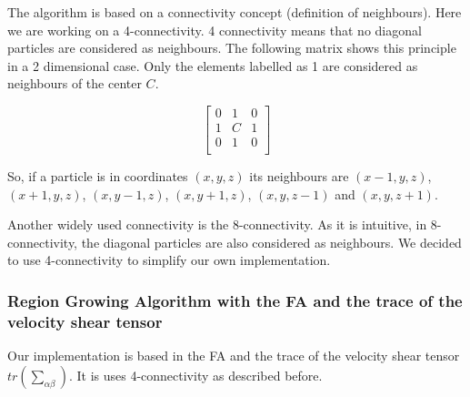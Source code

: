 \documentclass[12pt]{article}
\begin{document}
\begin{par}
The algorithm is based on a connectivity concept (definition of
neighbours). Here we are working on a 4-connectivity. 4
connectivity means that no diagonal particles are considered as
neighbours. The following matrix shows this principle in a 2
dimensional case. Only the elements labelled as 1 are considered as
neighbours of the center $C$.
\end{par}

\[ 
\begin{bmatrix} 
    0 & 1 & 0 \\
    1 & C & 1 \\
    0 & 1 & 0\\
\end{bmatrix} 
\]

\begin{par}
So, if a particle is in coordinates $(x,y,z)$ its neighbours are
$(x-1,y,z)$, $(x+1,y,z)$, $(x,y-1,z)$, $(x,y+1,z)$, $(x,y,z-1)$
and $(x,y,z+1)$.
\end{par}

\begin{par}
Another widely used connectivity is the 8-connectivity. As it is
intuitive, in 8-connectivity, the diagonal particles are also
considered as neighbours. We decided to use 4-connectivity to
simplify our own implementation.
\end{par}




\subsubsection{Region Growing Algorithm with the FA and the trace of the velocity shear tensor}\label{sec:own_impl_descr}
Our implementation is based in the FA and the trace of the velocity shear tensor $tr\left(\sum_{\alpha \beta}\right)$. It is uses 4-connectivity as described before.
\end{document}
